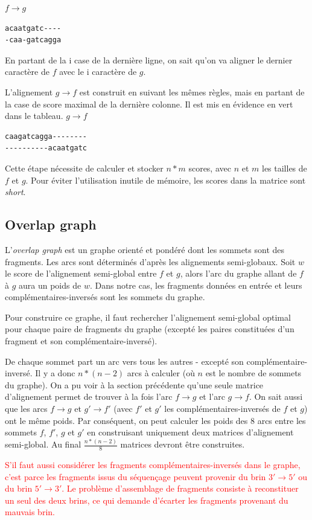 \documentclass{article}
\begin{document}
$f \to g$
\begin{verbatim}
acaatgatc----
-caa-gatcagga
\end{verbatim}
En partant de la i case de la dernière ligne, on sait qu'on va aligner le dernier caractère de $f$ avec le i caractère de $g$. 

L'alignement $g \to f$ est construit en suivant les mêmes règles, mais en partant de la case de score maximal de la dernière colonne. Il est mis en évidence en vert dans le tableau.
$g \to f$
\begin{verbatim}
caagatcagga--------
----------acaatgatc
\end{verbatim}


Cette étape nécessite de calculer et stocker $n*m$ scores, avec $n$ et $m$ les tailles de $f$ et $g$. Pour éviter l'utilisation inutile de mémoire, les scores dans la matrice sont \textit{short}.

\subsection{Overlap graph}

L'\textit{overlap graph} est un graphe orienté et pondéré dont les sommets sont des fragments. Les arcs sont déterminés d'après les alignements semi-globaux. Soit $w$ le score de l'alignement semi-global entre $f$ et $g$, alors l'arc du graphe allant de $f$ à $g$ aura un poids de $w$. Dans notre cas, les fragments données en entrée et leurs complémentaires-inversés sont les sommets du graphe.

Pour construire ce graphe, il faut rechercher l'alignement semi-global optimal pour chaque paire de fragments du graphe (excepté les paires constituées d'un fragment et son complémentaire-inversé).

De chaque sommet part un arc vers tous les autres - excepté son complémentaire-inversé. Il y a donc $n*(n-2)$ arcs à calculer (où $n$ est le nombre de sommets du graphe). On a pu voir à la section précédente qu'une seule matrice d'alignement permet de trouver à la fois l'arc $f\to g$ et l'arc $g \to f$. On sait aussi que les arcs $f \to g$ et $g' \to f'$  (avec $f'$ et $g'$ les complémentaires-inversés de $f$ et $g$) ont le même poids. Par conséquent, on peut calculer les poids des 8 arcs entre les sommets $f$, $f'$, $g$ et $g'$ en construisant uniquement deux matrices d'alignement semi-global. Au final $\frac{n*(n-2)}{8}$ matrices devront être construites.

\textcolor{red}{
S'il faut aussi considérer les fragments complémentaires-inversés dans le graphe, c'est parce les fragments issus du séquençage peuvent provenir du brin $3' \to 5'$ ou du brin $5' \to 3'$. Le problème d'assemblage de fragments consiste à reconstituer un seul des deux brins, ce qui demande d'écarter les fragments provenant du mauvais brin. }
\end{document}
